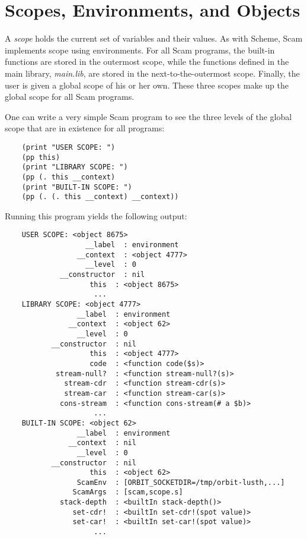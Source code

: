 \chapter{Scopes, Environments, and Objects}
\label{ScopesEnvironmentsObjects}

A {\it scope} holds the current set of variables and their values.
As with Scheme, Scam implements scope using environments.
For all Scam programs, the built-in functions are stored
in the outermost scope, while the functions defined
in the main library, {\it main.lib}, are stored in the next-to-the-outermost
scope. Finally, the user is given a global scope of his or her own.
These three scopes make up the global scope for all 
Scam programs.

One can write a very simple Scam program to see the three
levels of the global scope that are in existence for all programs:

\begin{verbatim}
    (print "USER SCOPE: ")
    (pp this)
    (print "LIBRARY SCOPE: ")
    (pp (. this __context)
    (print "BUILT-IN SCOPE: ")
    (pp (. (. this __context) __context))
\end{verbatim}

Running this program yields the following output:

\begin{verbatim}
    USER SCOPE: <object 8675>
                   __label  : environment
                 __context  : <object 4777>
                   __level  : 0
             __constructor  : nil
                    this  : <object 8675>
                     ...
    LIBRARY SCOPE: <object 4777>
                 __label  : environment
               __context  : <object 62>
                 __level  : 0
           __constructor  : nil
                    this  : <object 4777>
                    code  : <function code($s)>
            stream-null?  : <function stream-null?(s)>
              stream-cdr  : <function stream-cdr(s)>
              stream-car  : <function stream-car(s)>
             cons-stream  : <function cons-stream(# a $b)>
                     ...
    BUILT-IN SCOPE: <object 62>
                 __label  : environment
               __context  : nil
                 __level  : 0
           __constructor  : nil
                    this  : <object 62>
                 ScamEnv  : [ORBIT_SOCKETDIR=/tmp/orbit-lusth,...]
                ScamArgs  : [scam,scope.s]
             stack-depth  : <builtIn stack-depth()>
                set-cdr!  : <builtIn set-cdr!(spot value)>
                set-car!  : <builtIn set-car!(spot value)>
                     ...
\end{verbatim}

